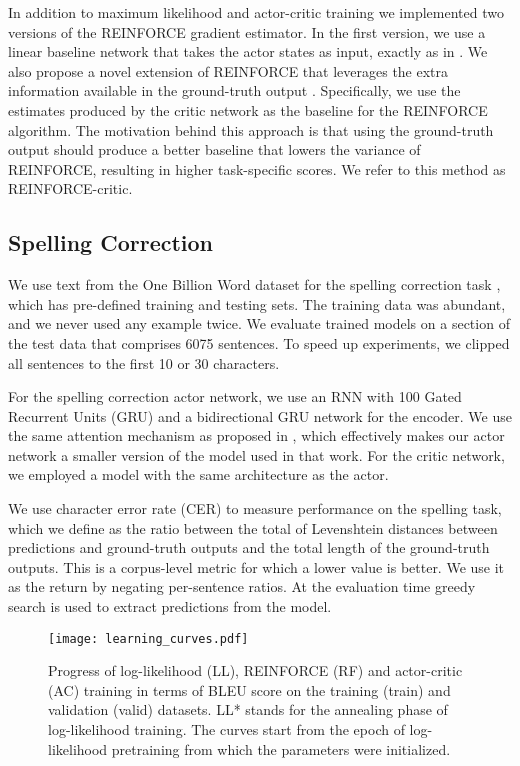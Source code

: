 \documentclass{article} \usepackage{iclr2017_conference,times}
\begin{document}
In addition to maximum likelihood and actor-critic training we implemented two versions of
the REINFORCE gradient estimator. In the first version, we use a linear baseline network that takes
the actor states as input, exactly as in \citep{ranzato2015sequence}. 
We also propose a novel extension of REINFORCE that leverages the extra information available
in the ground-truth output . Specifically, we use the  estimates produced by
the critic network as the baseline for the REINFORCE algorithm. The motivation behind this approach
is that using the ground-truth output should produce a better baseline that lowers
the variance of REINFORCE, resulting in higher task-specific scores. We refer
to this method as REINFORCE-critic. 
\subsection{Spelling Correction} 

We use text from the One Billion Word dataset for the spelling correction
task \citep{chelba2013one}, which has pre-defined training and testing sets.
The training data was abundant, and we never used any example twice.  We
evaluate trained models on a section of the test data that comprises 6075
sentences. To speed up experiments, we clipped all sentences to the first 10
or 30 characters.

For the spelling correction actor network, we use an RNN with 100 Gated
Recurrent Units (GRU) and a bidirectional GRU network for the encoder. We
use the same attention mechanism as proposed in \citep{bahdanau2015neural},
which effectively makes our actor network a smaller version of the model used
in that work. For the critic network, we employed a model
with the same architecture as the actor. 

We use character error rate (CER) to measure performance on the spelling
task, which we define as the ratio between the total of Levenshtein distances
between predictions and ground-truth outputs and the total length of the
ground-truth outputs. This is a corpus-level metric for which a lower value 
is better. We use it as the return by negating
per-sentence ratios. At the evaluation time greedy search is used to extract
predictions from the model.

\begin{wrapfigure}{r}{0.5\textwidth}
    \centering
    \texttt{[image: learning\_curves.pdf]}
    \caption{Progress of log-likelihood (LL), REINFORCE (RF) and actor-critic (AC) training
        in terms of BLEU score on the training (train) and
        validation (valid) datasets. LL* stands for the annealing phase of log-likelihood training. 
        The curves start from the epoch of log-likelihood
        pretraining from which the parameters were initialized. 
    }
    \label{fig:progress}       
\end{wrapfigure}    
\end{document}
